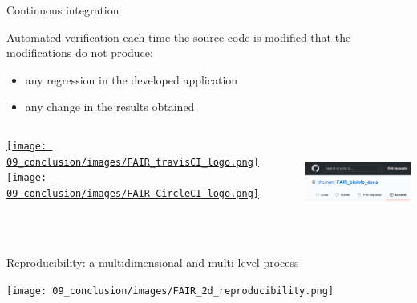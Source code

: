 \begin{frame}{Continuous integration}

Automated verification each time the source code is modified that the modifications do not produce:
\begin{itemize}
    \item any regression in the developed application
    \item any change in the results obtained
\end{itemize}
\begin{columns}
\begin{center}
    \href{https://docs.travis-ci.com/user/tutorial/}{\texttt{[image: 09\_conclusion/images/FAIR\_travisCI\_logo.png]}}
    \href{https://circleci.com/integrations/github/}{\texttt{[image: 09\_conclusion/images/FAIR\_CircleCI\_logo.png]}}
\end{center}
\begin{center}
    \href{https://circleci.com/integrations/github/}{\includegraphics[height=3cm]{09_conclusion/images/FAIR_Github_Actions.png}}
    \end{center}
\end{columns}
 \end{frame}
\begin{frame}{Reproducibility: a multidimensional and multi-level process}

\begin{center}
    \texttt{[image: 09\_conclusion/images/FAIR\_2d\_reproducibility.png]}
\end{center}

\end{frame}
%
%
%
%


